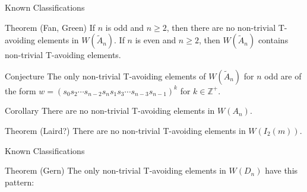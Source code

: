 \documentclass[9pt,handout]{beamer}
\newcommand\heapblock[4]{\fill[fill=#4, fill opacity=0.35, draw=#4, line width=1.1pt, rounded corners,shift={(\xxaxis:#1)},shift={(\yyaxis:#2)}] (-1,-1) rectangle (1,1);\node at (#1,#2) {\footnotesize $#3$};}
\newcommand\xxaxis{0}
\newcommand\yyaxis{90}
\begin{document}


\begin{frame}{Known Classifications}

\begin{block}{Theorem (Fan, Green)}
	If $n$ is odd and $n \geq 2$, then there are no non-trivial T-avoiding elements in $W(\widetilde{A}_n)$. If $n$ is even and $n \geq 2$, then $W(\widetilde{A}_n)$ contains non-trivial T-avoiding elements.
\end{block}
\pause
\begin{block}{Conjecture}
The only non-trivial T-avoiding elements of $W(\widetilde{A}_n)$ for $n$ odd are of the form $w=(s_0s_2 \cdots s_{n-2}s_ns_1s_3 \cdots s_{n-3}s_{n-1})^k$  for $k \in \mathbb{Z}^+$.	
\end{block}
\pause
\begin{block}{Corollary}
There are no non-trivial T-avoiding elements in $W(A_n)$.	
\end{block}
\pause
\begin{block}{Theorem (Laird?)}
	There are no non-trivial T-avoiding elements in $W(I_2(m))$.
\end{block}

\end{frame}




\begin{frame}{Known Classifications}

\begin{block}{Theorem (Gern)}
The only non-trivial T-avoiding elements in $W(D_n)$ have this pattern:	
\end{block}

\begin{figure}
\end{figure}
	
\end{frame}
\end{document}
